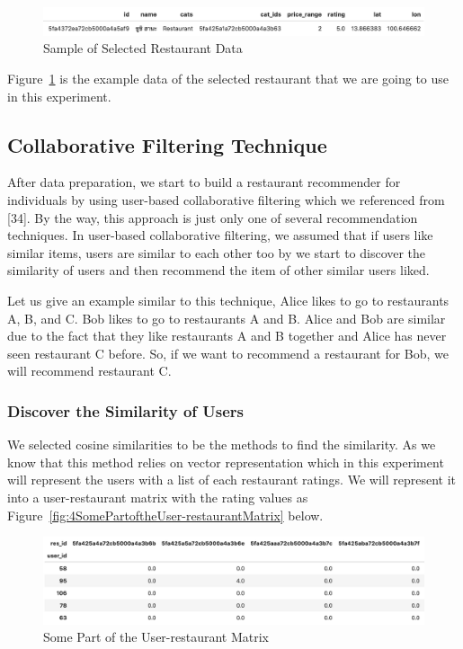 \documentclass[12pt,oneside,openright,a4paper]{cpe-english-project}
\begin{document}
\begin{figure}[H]\centering
\includegraphics[width=350pt]{./images/4SampleofSelectedRestaurantData.png}
\caption{Sample of Selected Restaurant Data}\label{fig:4SampleofSelectedRestaurantData}
\end{figure}

Figure~\ref{fig:4SampleofSelectedRestaurantData} is the example data of the selected restaurant that we are going to use in this experiment.

\subsection{Collaborative Filtering Technique}

After data preparation, we start to build a restaurant recommender for individuals by using user-based collaborative filtering which we referenced from [34]. By the way, this approach is just only one of several recommendation techniques. In user-based collaborative filtering, we assumed that if users like similar items, users are similar to each other too by we start to discover the similarity of users and then recommend the item of other similar users liked.

Let us give an example similar to this technique, Alice likes to go to restaurants A, B, and C. Bob likes to go to restaurants A and B. Alice and Bob are similar due to the fact that they like restaurants A and B together and Alice has never seen restaurant C before. So, if we want to recommend a restaurant for Bob, we will recommend restaurant C.

\subsubsection{Discover the Similarity of Users}

We selected cosine similarities to be the methods to find the similarity. As we know that this method relies on vector representation which in this experiment will represent the users with a list of each restaurant ratings. We will represent it into a user-restaurant matrix with the rating values as Figure~\ref{fig:4SomePartoftheUser-restaurantMatrix} below.

\begin{figure}[H]\centering
\includegraphics[width=350pt]{./images/4SomePartoftheUserrestaurantMatrix.png}
\caption{Some Part of the User-restaurant Matrix}\label{fig:4SomePartoftheUserrestaurantMatrix}
\end{figure}
\end{document}
